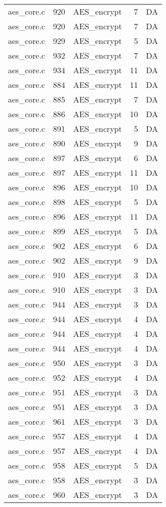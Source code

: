 \begin{table}
\begin{tabular}{clrrr}
aes\_core.c& 920&AES\_encrypt&7 &DA\\
aes\_core.c& 920&AES\_encrypt&7 &DA\\
aes\_core.c& 929&AES\_encrypt&5 &DA\\
aes\_core.c& 932&AES\_encrypt&7 &DA\\
aes\_core.c& 934&AES\_encrypt&11&DA\\
aes\_core.c& 884&AES\_encrypt&11&DA\\
aes\_core.c& 885&AES\_encrypt&7 &DA\\
aes\_core.c& 886&AES\_encrypt&10&DA\\
aes\_core.c& 891&AES\_encrypt&5 &DA\\
aes\_core.c& 890&AES\_encrypt&9 &DA\\
aes\_core.c& 897&AES\_encrypt&6 &DA\\
aes\_core.c& 897&AES\_encrypt&11&DA\\
aes\_core.c& 896&AES\_encrypt&10&DA\\
aes\_core.c& 898&AES\_encrypt&5 &DA\\
aes\_core.c& 896&AES\_encrypt&11&DA\\
aes\_core.c& 899&AES\_encrypt&5 &DA\\
aes\_core.c& 902&AES\_encrypt&6 &DA\\
aes\_core.c& 902&AES\_encrypt&9 &DA\\
aes\_core.c& 910&AES\_encrypt&3 &DA\\
aes\_core.c& 910&AES\_encrypt&3 &DA\\
aes\_core.c& 944&AES\_encrypt&3 &DA\\
aes\_core.c& 944&AES\_encrypt&4 &DA\\
aes\_core.c& 944&AES\_encrypt&4 &DA\\
aes\_core.c& 944&AES\_encrypt&4 &DA\\
aes\_core.c& 950&AES\_encrypt&3 &DA\\
aes\_core.c& 952&AES\_encrypt&4 &DA\\
aes\_core.c& 951&AES\_encrypt&3 &DA\\
aes\_core.c& 951&AES\_encrypt&3 &DA\\
aes\_core.c& 961&AES\_encrypt&3 &DA\\
aes\_core.c& 957&AES\_encrypt&4 &DA\\
aes\_core.c& 957&AES\_encrypt&4 &DA\\
aes\_core.c& 958&AES\_encrypt&5 &DA\\
aes\_core.c& 958&AES\_encrypt&3 &DA\\
aes\_core.c& 960&AES\_encrypt&3 &DA\\
\hline
\end{tabular}
\renewcommand{\baselinestretch}{1.0}\selectfont
\end{table}
